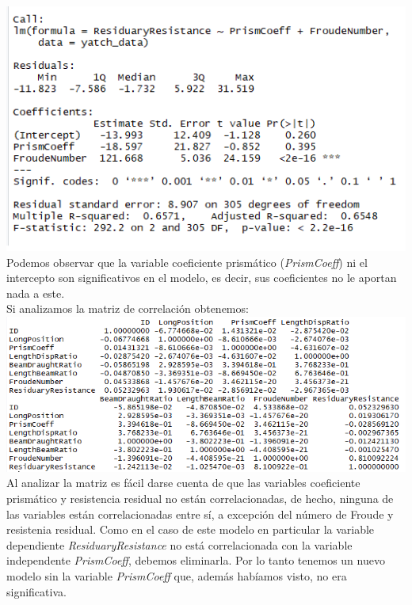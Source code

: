 \documentclass[twoside]{article}
\begin{document}
\begin{multicols}{2}
\includegraphics[scale = 0.5]{images/pic_01.png} \\

Podemos observar que la variable coeficiente prism\'atico (\textit{PrismCoeff}) ni el intercepto son significativos en el modelo, es decir, sus coeficientes no le aportan nada a este. \\
Si analizamos la matriz de correlaci\'on obtenemos: \\

\includegraphics[scale = 0.4]{images/pic_02.png} \\

Al analizar la matriz es f\'acil darse cuenta de que las variables coeficiente prism\'atico y resistencia residual no est\'an correlacionadas, de hecho, ninguna de las variables est\'an correlacionadas entre s\'i, a excepci\'on del n\'umero de Froude y resistenia residual. Como en el caso de este modelo en particular la variable dependiente \textit{ResiduaryResistance} no est\'a correlacionada con la variable independente \textit{PrismCoeff}, debemos eliminarla. Por lo tanto tenemos un nuevo modelo sin la variable \textit{PrismCoeff} que, adem\'as hab\'iamos visto, no era significativa.\\


\end{multicols}
\end{document}
